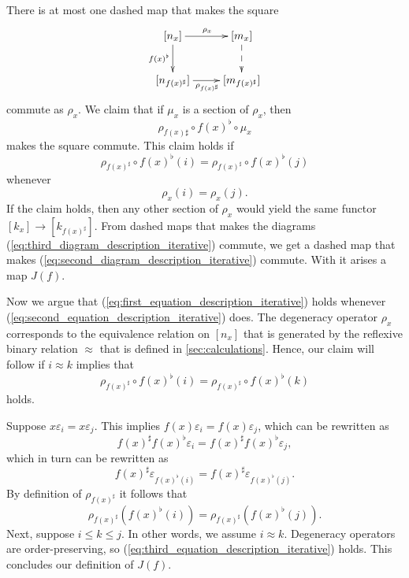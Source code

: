 There is at most one dashed map that makes the square
\begin{equation}
\label{eq:third_diagram_description_iterative}
\begin{gathered}
 \xymatrix{
 [n_x] \ar[d]_{f(x)^\flat } \ar[r]^{\rho _x} & [m_x] \ar@{-->}[d] \\
 [n_{f(x)^\sharp }] \ar[r]_{\rho _{f(x)^\sharp }} & [m_{f(x)^\sharp }]
 }
\end{gathered}
\end{equation}
commute as $\rho _x$. We claim that if $\mu _x$ is a section of $\rho _x$, then
\[\rho _{f(x)\sharp }\circ f(x)^\flat \circ \mu _x\]
makes the square commute. This claim holds if
\begin{equation}\label{eq:first_equation_description_iterative}
\rho _{f(x)^\sharp }\circ f(x)^\flat (i)=\rho _{f(x)^\sharp }\circ f(x)^\flat (j)
\end{equation}
whenever
\begin{equation}\label{eq:second_equation_description_iterative}
\rho _x(i)=\rho _x(j).
\end{equation}
If the claim holds, then any other section of $\rho _x$ would yield the same functor $[k_x]\to [k_{f(x)^\sharp }]$. From dashed maps that makes the diagrams (\ref{eq:third_diagram_description_iterative}) commute, we get a dashed map that makes (\ref{eq:second_diagram_description_iterative}) commute. With it arises a map $J(f)$.

Now we argue that (\ref{eq:first_equation_description_iterative}) holds whenever (\ref{eq:second_equation_description_iterative}) does. The degeneracy operator $\rho _x$ corresponds to the equivalence relation on $[n_x]$ that is generated by the reflexive binary relation $\approx$ that is defined in \cref{sec:calculations}. Hence, our claim will follow if $i\approx k$ implies that
\begin{equation}\label{eq:third_equation_description_iterative}
\rho _{f(x)^\sharp }\circ f(x)^\flat (i)=\rho _{f(x)^\sharp }\circ f(x)^\flat (k)
\end{equation}
holds.

Suppose $x\varepsilon _i=x\varepsilon _j$. This implies $f(x)\varepsilon _i=f(x)\varepsilon _j$, which can be rewritten as
\[f(x)^\sharp f(x)^\flat \varepsilon _i=f(x)^\sharp f(x)^\flat \varepsilon _j,\]
which in turn can be rewritten as
\[f(x)^\sharp \varepsilon _{f(x)^\flat (i)}=f(x)^\sharp \varepsilon _{f(x)^\flat (j)}.\]
By definition of $\rho _{f(x)^\sharp }$ it follows that
\[\rho _{f(x)^\sharp }(f(x)^\flat (i))=\rho _{f(x)^\sharp }(f(x)^\flat (j)).\]
Next, suppose $i\leq k\leq j$. In other words, we assume $i\approx k$. Degeneracy operators are order-preserving, so (\ref{eq:third_equation_description_iterative}) holds. This concludes our definition of $J(f)$.

